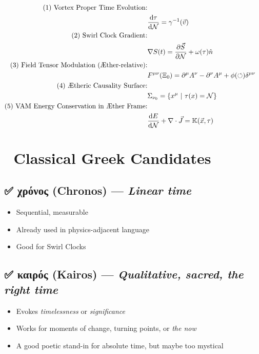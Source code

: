 \documentclass[a4paper,12pt]{article}
\begin{document}
    \begin{align}
        \text{(1) Vortex Proper Time Evolution:}\\
        \quad & \dv{\tau}{\mathcal{N}} = \gamma^{-1}(\vec{v}) \\
        \text{(2) Swirl Clock Gradient:}\\ \quad & \nabla S(t) = \frac{\partial \vec{S}}{\partial \mathcal{N}} + \omega(\tau) \hat{n} \\
        \text{(3) Field Tensor Modulation (Æther-relative):} \\\quad & F^{\mu\nu}(\Xi_0) = \partial^\mu A^\nu - \partial^\nu A^\mu + \phi(\circlearrowleft) \delta^{\mu\nu} \\
        \text{(4) Ætheric Causality Surface:}\\ \quad & \Sigma_{\nu_0} = \{ x^\mu \ | \ \tau(x) = \mathcal{N} \} \\
        \text{(5) VAM Energy Conservation in Æther Frame:}\\ \quad & \dv{E}{\mathcal{N}} + \nabla \cdot \vec{J} = \mathbb{K}(\vec{x}, \tau)
    \end{align}


\section*{🔀 Classical Greek Candidates}
\subsection*{✅ χρόνος (Chronos) — \textit{Linear time}}
\begin{itemize}
\item Sequential, measurable
\item Already used in physics-adjacent language
\item Good for Swirl Clocks
\end{itemize}

\subsection*{✅ καιρός (Kairos) — \textit{Qualitative, sacred, the right time}}
\begin{itemize}
\item Evokes \textit{timelessness} or \textit{significance}
\item Works for moments of change, turning points, or \textit{the now}
\item A good poetic stand-in for absolute time, but maybe too mystical
\end{itemize}
\end{document}

